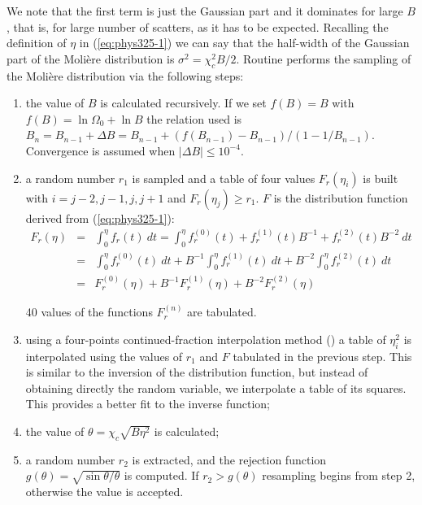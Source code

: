 We note that the first term is just the Gaussian part and it dominates
for large $B$, that is, for large number of scatters, as it has to
be expected. Recalling the definition of $\eta$ in (\ref{eq:phys325-1})
we can say that the half-width of the Gaussian part of the Moli\`{e}re
distribution is $\sigma^{2} = \chi_{c}^2 B/2$.
Routine  performs the sampling of the Moli\`{e}re 
distribution via the following steps:

\begin{enumerate}
\item the value of $B$ is calculated recursively. If we set $f(B) = 
B$ with $f(B) = \ln \Omega_0  + \ln B$ the relation used is
$B_n = B_{n-1} + \Delta B = B_{n-1} + (f(B_{n-1}) - B_{n-1})/
(1-1/B_{n-1})$. Convergence is assumed when $|\Delta B| \leq 10^{-4}$.

\item a random number $r_1$ is sampled and
a table of four values $F_{r}(\eta_i)$ is built with
$i = j-2,j-1,j,j+1$ and $F_{r}(\eta_j) \geq r_1$. $F$ is the distribution
function derived from (\ref{eq:phys325-1}):
\begin{eqnarray*}
F_{r}(\eta) & = & \int_{0}^{\eta}{f_{r}(t) \: dt}
= \int_{0}^{\eta}{f_{r}^{(0)}(t)+f_{r}^{(1)}(t)B^{-1}+f_{r}^{(2)}(t)B^{-2} \: dt} \\
& = & \int_{0}^{\eta}{f_{r}^{(0)}(t) \: dt} + 
B^{-1} \int_{0}^{\eta}{f_{r}^{(1)}(t) \: dt} +
B^{-2} \int_{0}^{\eta}{f_{r}^{(2)}(t) \: dt} \\
& = & F_{r}^{(0)}(\eta) +
B^{-1} F_{r}^{(1)}(\eta) + B^{-2} F_{r}^{(2)}(\eta)
\end{eqnarray*}

40 values of the functions $F_{r}^{(n)}$ are tabulated.

\item using a four-points continued-fraction interpolation method 
() a table of $\eta_i^2$ is interpolated using
the values of $r_1$ and $F$ tabulated in the previous step. 
This is similar
to the inversion of the distribution function, but instead of
obtaining directly the random variable, we interpolate a table
of its squares.
This provides a better fit to the inverse function;

\item the value of $\theta = \chi_{c} \sqrt{B \eta^2}$ is calculated;

\item a random number $r_2$ is extracted, and the rejection function
$g(\theta) = \sqrt{\sin\theta/\theta}$ is computed. If $r_2 > g(\theta)$
resampling begins from step 2, otherwise the value is accepted.
\end{enumerate}

